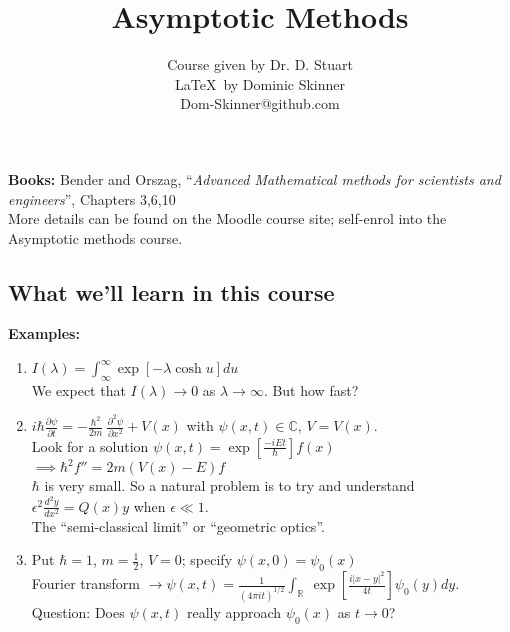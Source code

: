 \documentclass{article}
\begin{document}
\title{Asymptotic Methods}
\author{Course given by Dr. D. Stuart \\
\LaTeX\  by Dominic Skinner \\
Dom-Skinner@github.com}
\maketitle
\noindent \textbf{Books:} Bender and Orszag, ``\emph{Advanced Mathematical methods for 
scientists and engineers}'', Chapters 3,6,10 \\
More details can be found on the Moodle course site; self-enrol into the
Asymptotic methods course.
\\
\subsection*{What we'll learn in this course}
\textbf{Examples:} 
\begin{enumerate}[1.]
\item $I(\lambda) = \int_{\infty}^{\infty} \exp[-\lambda \cosh u] du $
		\\ We expect that $I(\lambda) \to 0$ as $\lambda \to \infty$. But how fast?
\item $i \hbar \frac{\partial \psi}{\partial t} = -\frac{\hbar^2}{2m} \
		\frac{\partial ^2 \psi}{\partial x^2} + V(x)$ with $\psi(x,t) \in \mathbb{C}$,
		$V = V(x)$. \\
		Look for a solution $\psi(x,t) = \exp \left[\frac{-iEt}{\hbar} \right] f(x)$
		$\implies \hbar^2 f'' = 2m(V(x) -E)f$ 
		\\
		$\hbar$ is very small. So a natural problem is to try and understand
		$\epsilon^2 \frac{d^2y}{dx^2} = Q(x)y$ when $\epsilon \ll 1$.
		\\ The ``semi-classical limit'' or ``geometric optics''.
\item Put $\hbar = 1$, $m=\frac{1}{2}$, $V=0$; specify $\psi(x,0) = \psi_0(x)$
		\\
		Fourier transform $\to \psi(x,t) = \frac{1}{(4\pi i t)^{1/2}} \int_{\mathbb{R}} \
		\exp\left[ \frac{i|x-y|^2}{4t} \right] \psi_0(y) dy$.
		\\
		Question: Does $\psi(x,t)$ really approach $\psi_0(x)$ as $t\to0$?
\end{enumerate}
%
\end{document}
